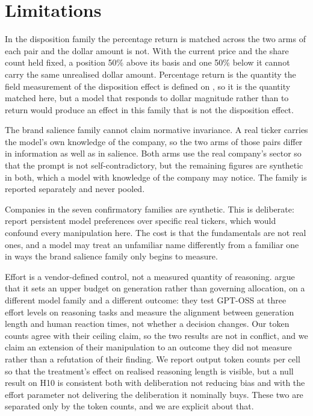 \section{Limitations}
\label{sec:limitations}

In the disposition family the percentage return is matched across the two
arms of each pair and the dollar amount is not. With the current price and
the share count held fixed, a position 50\% above its basis and one 50\%
below it cannot carry the same unrealised dollar amount. Percentage return is
the quantity the field measurement of the disposition effect is defined on
\citep{odean1998losses}, so it is the quantity matched here, but a model that
responds to dollar magnitude rather than to return would produce an effect in
this family that is not the disposition effect.

The brand salience family cannot claim normative invariance. A real ticker
carries the model's own knowledge of the company, so the two arms of those
pairs differ in information as well as in salience. Both arms use the real
company's sector so that the prompt is not self-contradictory, but the
remaining figures are synthetic in both, which a model with knowledge of the
company may notice. The family is reported separately and never pooled.

Companies in the seven confirmatory families are synthetic. This is
deliberate: \citet{lee2025yourai} report persistent model preferences over
specific real tickers, which would confound every manipulation here. The cost
is that the fundamentals are not real ones, and a model may treat an
unfamiliar name differently from a familiar one in ways the brand salience
family only begins to measure.

Effort is a vendor-defined control, not a measured quantity of reasoning.
\citet{hu2026effort} argue that it sets an upper budget on generation rather
than governing allocation, on a different model family and a different
outcome: they test GPT-OSS at three effort levels on reasoning tasks and
measure the alignment between generation length and human reaction times,
not whether a decision changes. Our token counts agree with their ceiling
claim, so the two results are not in conflict, and we claim an extension of
their manipulation to an outcome they did not measure rather than a
refutation of their finding. We report output token counts per cell so that the
treatment's effect on realised reasoning length is visible, but a null result
on H10 is consistent both with deliberation not reducing bias and with the
effort parameter not delivering the deliberation it nominally buys. These two
are separated only by the token counts, and we are explicit about that.



